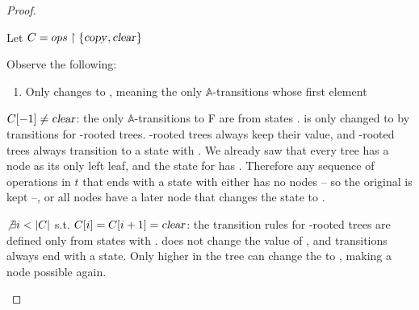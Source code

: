 \documentclass[12pt]{article}
\theoremstyle{definition}
\begin{document}
\begin{proof}
\begin{enumerate}
Let $C=ops\restriction \{\text{\textsl{copy}},\text{\textsl{clear}}\}$

Observe the following:

\begin{enumerate}
\item Only \cl changes  to , meaning the only $\mathbb{A}$-transitions whose first element 
\end{enumerate}

$C[-1] \neq \text{\textsl{clear}}$: the only $\mathbb{A}$-transitions to F are from states .  is only changed to  by transitions for \cl-rooted trees.  \mg-rooted trees always keep their  value, and \cp-rooted trees always transition to a state with . We already saw that every tree has a \start node as its only left leaf, and the state for \start has . Therefore any sequence of operations in $t$ that ends with a state with  either has no \cl nodes -- so the original  is kept --, or all \cl nodes have a later \cp node that changes the state to .

$ \not\exists i<|C|$ s.t. $C[i]=C[i+1]=\text{\textsl{clear}}$: the transition rules for \cl-rooted trees are defined only from states with . \mg does not change the value of , and \cl transitions always end with a  state. Only \cp higher in the tree can change the  to , making a \cl node possible again.


\end{enumerate}
\end{proof}
\end{document}
